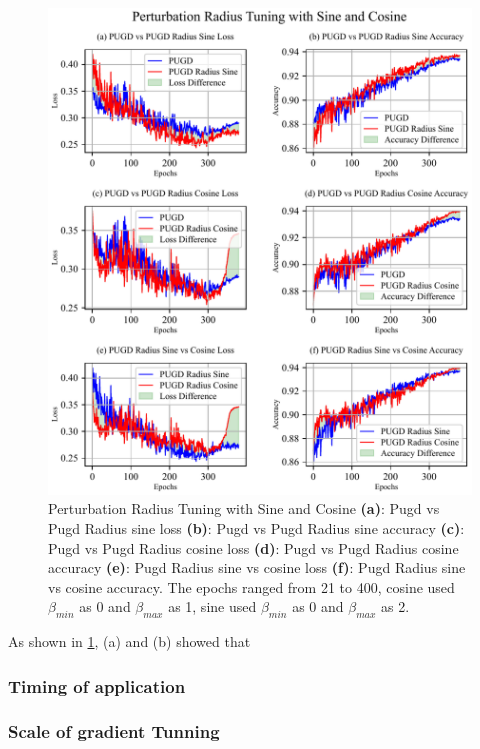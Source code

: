 \documentclass[10pt,twocolumn,letterpaper]{article}
\begin{document}
\begin{figure}[htbp]
	\center
	\vspace{-10pt} 
	\includegraphics[width=\columnwidth]{images/PUGDRadius.pdf}
	\caption{Perturbation Radius Tuning with Sine and Cosine
	\textbf{(a)}: Pugd vs Pugd Radius sine loss \textbf{(b)}: Pugd vs Pugd Radius sine accuracy
    \textbf{(c)}: Pugd vs Pugd Radius cosine loss \textbf{(d)}: Pugd vs Pugd Radius cosine accuracy
	\textbf{(e)}: Pugd Radius sine vs cosine loss \textbf{(f)}: Pugd Radius sine vs cosine accuracy. The epochs ranged from 21 to 400, cosine used $\beta_{min}$ as 0 and $\beta_{max}$ as 1, sine used $\beta_{min}$ as 0 and $\beta_{max}$ as 2.}
	\vspace{-15pt} 
	\label{fig:PUGDRadius}
\end{figure}
As shown in \cref{fig:PUGDRadius}, (a) and (b) showed that 



\subsubsection{Timing of application}
\label{subsec:4.1.2}

\subsubsection{Scale of gradient Tunning}
\label{subsec:4.1.3}
\end{document}
